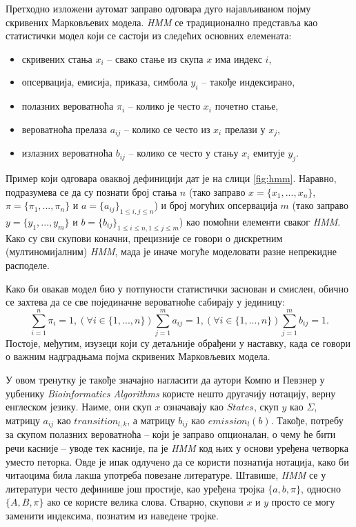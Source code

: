 \documentclass[12pt,oneside]{memoir}
\begin{document}
\begin{CJK}{UTF8}{ipxm}
Претходно изложени аутомат заправо одговара дуго најављиваном појму скривених Марковљевих модела. \textit{HMM} се традиционално представља као статистички модел који се састоји из следећих основних елемената:
\begin{itemize}
  \item скривених стања $x_i$ -- свако стање из скупа $x$ има индекс $i$,
  \item опсервација, емисија, приказа, симбола $y_i$ -- такође индексирано,
  \item полазних вероватноћа $\pi_i$ -- колико је често $x_i$ почетно стање,
  \item вероватноћа прелаза $a_{ij}$ -- колико се често из $x_i$ прелази у $x_j$,
  \item излазних вероватноћа $b_{ij}$ -- колико се често у стању $x_i$ емитује $y_j$.
\end{itemize}
Пример који одговара оваквој дефиницији дат је на слици \ref{fig:hmm}. Наравно, подразумева се да су познати број стања $n$ (тако заправо $x = \{x_1, ..., x_n\}$, $\pi = \{\pi_1, ..., \pi_n\}$ и $a = \{a_{ij}\}_{1 \leq i, j \leq n}$) и број могућих опсервација $m$ (тако заправо $y = \{y_1, ..., y_m\}$ и $b = \{b_{ij}\}_{1 \leq i \leq n, 1 \leq j \leq m}$) као помоћни елементи сваког \textit{HMM}. Како су сви скупови коначни, прецизније се говори о дискретним (мултиномијалним) \textit{HMM}, мада је иначе могуће моделовати разне непрекидне расподеле\cite{jordan2004}.

Како би овакав модел био у потпуности статистички заснован и смислен, обично се захтева да се све појединачне вероватноће сабирају у јединицу: $$\sum_{i=1}^n \pi_i = 1, (\forall i \in \{1, ..., n\}) \sum_{j=1}^m a_{ij} = 1, (\forall i \in \{1, ..., n\}) \sum_{j=1}^m b_{ij} = 1.$$ Постоје, међутим, изузеци који су детаљније обрађени у наставку, када се говори о важним надградњама појма скривених Марковљевих модела.

У овом тренутку је такође значајно нагласити да аутори Компо и Певзнер у уџбенику \textit{Bioinformatics Algorithms} користе нешто другачију нотацију, верну енглеском језику. Наиме, они скуп $x$ означавају као $States$, скуп $y$ као $\Sigma$, матрицу $a_{ij}$ као $transition_{l, k}$, а матрицу $b_{ij}$ као $emission_l(b)$. Такође, потребу за скупом полазних вероватноћа -- који је заправо опционалан, о чему ће бити речи касније -- уводе тек касније, па је \textit{HMM} код њих у основи уређена четворка уместо петорка. Овде је ипак одлучено да се користи познатија нотација, како би читаоцима била лакша употреба повезане литературе. Штавише, \textit{HMM} се у литератури често дефинише још простије, као уређена тројка $\{a, b, \pi\}$, односно $\{A, B, \pi\}$ ако се користе велика слова. Стварно, скупови $x$ и $y$ просто се могу заменити индексима, познатим из наведене тројке.


\end{CJK}
\end{document}
